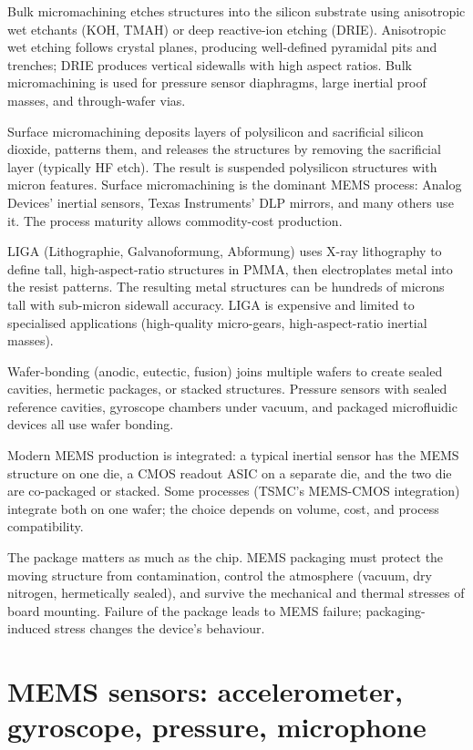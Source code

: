 Bulk micromachining etches structures into the silicon substrate using anisotropic wet etchants (KOH, TMAH) or deep reactive-ion etching (DRIE). Anisotropic wet etching follows crystal planes, producing well-defined pyramidal pits and trenches; DRIE produces vertical sidewalls with high aspect ratios. Bulk micromachining is used for pressure sensor diaphragms, large inertial proof masses, and through-wafer vias.

Surface micromachining deposits layers of polysilicon and sacrificial silicon dioxide, patterns them, and releases the structures by removing the sacrificial layer (typically HF etch). The result is suspended polysilicon structures with micron features. Surface micromachining is the dominant MEMS process: Analog Devices' inertial sensors, Texas Instruments' DLP mirrors, and many others use it. The process maturity allows commodity-cost production.

LIGA (Lithographie, Galvanoformung, Abformung) uses X-ray lithography to define tall, high-aspect-ratio structures in PMMA, then electroplates metal into the resist patterns. The resulting metal structures can be hundreds of microns tall with sub-micron sidewall accuracy. LIGA is expensive and limited to specialised applications (high-quality micro-gears, high-aspect-ratio inertial masses).

Wafer-bonding (anodic, eutectic, fusion) joins multiple wafers to create sealed cavities, hermetic packages, or stacked structures. Pressure sensors with sealed reference cavities, gyroscope chambers under vacuum, and packaged microfluidic devices all use wafer bonding.

Modern MEMS production is integrated: a typical inertial sensor has the MEMS structure on one die, a CMOS readout ASIC on a separate die, and the two die are co-packaged or stacked. Some processes (TSMC's MEMS-CMOS integration) integrate both on one wafer; the choice depends on volume, cost, and process compatibility.

The package matters as much as the chip. MEMS packaging must protect the moving structure from contamination, control the atmosphere (vacuum, dry nitrogen, hermetically sealed), and survive the mechanical and thermal stresses of board mounting. Failure of the package leads to MEMS failure; packaging-induced stress changes the device's behaviour.

\section{MEMS sensors: accelerometer, gyroscope, pressure, microphone}

